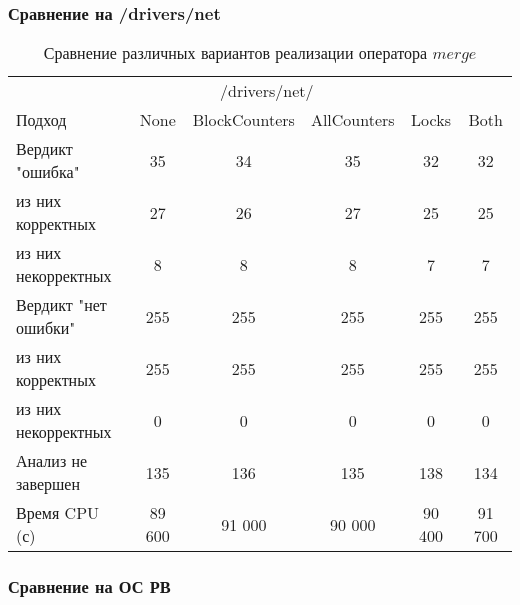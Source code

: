 \subsubsection{Сравнение на /drivers/net}
\begin{center}
  \begin{table}[h]\footnotesize \centering
  	\label{table-drivers-lock-merge}
    \caption{Сравнение различных вариантов реализации оператора $merge$}
    \begin{tabular}{ | l | c | c | c | c | c |}
      \hline
      		& 		 \multicolumn{3}{|c|}{/drivers/net/} \\
      Подход         				& None 	& BlockCounters & AllCounters 	& Locks 	& Both \\ \hline
      Вердикт "ошибка" 				& 35   	& 34       		& 35    		& 32       	& 32     \\ 
  \hspace{0.5cm} из них корректных 	& 27 	& 26 			& 27    		& 25       	& 25   \\ 
  \hspace{0.5cm} из них некорректных & 8 	& 8 			& 8     		& 7       	& 7    \\ \hline
      Вердикт "нет ошибки"  		& 255   & 255        	& 255   		& 255       & 255     \\ 
  \hspace{0.5cm} из них корректных 	& 255 	& 255    		& 255   		& 255       & 255     \\
  \hspace{0.5cm} из них некорректных & 0 	& 0    			& 0     		& 0       	& 0  \\ \hline
      Анализ не завершен       		& 135    & 136        	& 135    		& 138       & 134  \\ \hline
      Время CPU (с)   				& 89 600 & 91 000   	& 90 000    	& 90 400    & 91 700  \\ 
      \hline
    \end{tabular}
  \end{table}
\end{center}

\subsubsection{Сравнение на ОС РВ}

